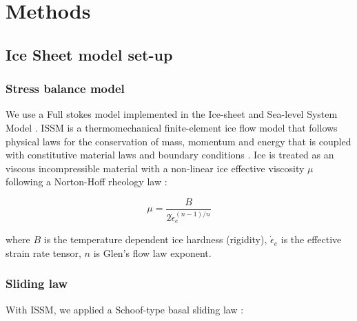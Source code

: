 \section{Methods} \label{sec:methods}

\subsection{Ice Sheet model set-up}


\subsubsection{Stress balance model}

We use a Full stokes model implemented in the Ice-sheet and Sea-level System Model \citep[ISSM, version 4.18;][]{LarourContinentalscalehigh2012}.
ISSM is a thermomechanical finite-element ice flow model that follows physical laws for the conservation of mass, momentum and energy that is coupled with constitutive material laws and boundary conditions \citep{LarourContinentalscalehigh2012}.
Ice is treated as an viscous incompressible material \citep{Cuffeyphysicsglaciers2010} with a non-linear ice effective viscosity $\mu$ following a Norton-Hoff rheology law \citep[Glen's flow law,][]{Glencreeppolycrystallineice1955}:

\begin{equation}
  \mu = \frac{B}{2 \dot{\epsilon}_e^{(n-1)/n}}
\end{equation}

where $B$ is the temperature dependent ice hardness (rigidity), $\dot{\epsilon}_e$ is the effective strain rate tensor, $n$ is Glen's flow law exponent.

\subsubsection{Sliding law}

With ISSM, we applied a Schoof-type basal sliding law \citep{Schoofeffectcavitationglacier2005}:


